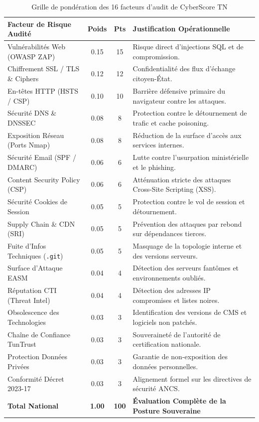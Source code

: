 \begin{table}[!htbp]
\centering
\caption{Grille de pondération des 16 facteurs d'audit de CyberScore TN}
\label{tab:weights}
\begin{singlespace}
\footnotesize
\renewcommand{\arraystretch}{1.0}
\begin{tabularx}{\textwidth}{p{4.6cm} c c X}
\toprule
\textbf{Facteur de Risque Audité} & \textbf{Poids} & \textbf{Pts} & \textbf{Justification Opérationnelle} \\
\midrule
Vulnérabilités Web (OWASP ZAP) & 0.15 & 15 & Risque direct d'injections SQL et de compromission. \\
Chiffrement SSL / TLS \& Ciphers & 0.12 & 12 & Confidentialité des flux d'échange citoyen-État. \\
En-têtes HTTP (HSTS / CSP) & 0.10 & 10 & Barrière défensive primaire du navigateur contre les attaques. \\
Sécurité DNS \& DNSSEC & 0.08 & 8 & Protection contre le détournement de trafic et cache poisoning. \\
Exposition Réseau (Ports Nmap) & 0.08 & 8 & Réduction de la surface d'accès aux services internes. \\
Sécurité Email (SPF / DMARC) & 0.06 & 6 & Lutte contre l'usurpation ministérielle et le phishing. \\
Content Security Policy (CSP) & 0.06 & 6 & Atténuation stricte des attaques Cross-Site Scripting (XSS). \\
Sécurité Cookies de Session & 0.05 & 5 & Protection contre le vol de session et détournement. \\
Supply Chain \& CDN (SRI) & 0.05 & 5 & Prévention des attaques par rebond sur dépendances tierces. \\
Fuite d'Infos Techniques (\texttt{.git}) & 0.05 & 5 & Masquage de la topologie interne et des versions serveurs. \\
Surface d'Attaque EASM & 0.04 & 4 & Détection des serveurs fantômes et environnements oubliés. \\
Réputation CTI (Threat Intel) & 0.04 & 4 & Détection des adresses IP compromises et listes noires. \\
Obsolescence des Technologies & 0.03 & 3 & Identification des versions de CMS et logiciels non patchés. \\
Chaîne de Confiance TunTrust & 0.03 & 3 & Souveraineté de l'autorité de certification nationale. \\
Protection Données Privées & 0.03 & 3 & Garantie de non-exposition des données personnelles. \\
Conformité Décret 2023-17 & 0.03 & 3 & Alignement formel sur les directives de sécurité ANCS. \\
\midrule
\textbf{Total National} & \textbf{1.00} & \textbf{100} & \textbf{Évaluation Complète de la Posture Souveraine} \\
\bottomrule
\end{tabularx}
\end{singlespace}
\end{table}

